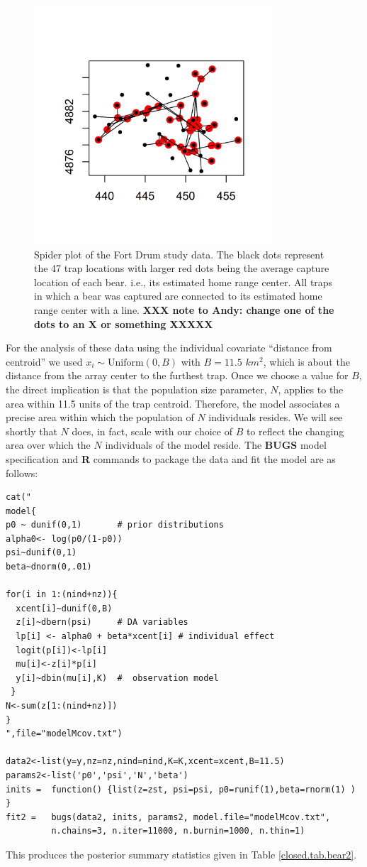 \begin{figure}[ht]
\centering
\includegraphics[height=3.5in,width=3.5in]{Ch4-Closed/figs/bear_spiderplot.png}
\caption{Spider plot of the Fort Drum study data.
The black dots represent the 47 trap locations with larger red dots
being the average capture location of each bear. i.e., its estimated home
range center. All traps in which a bear was captured are connected to
its estimated home range center with a line.
{\bf XXX note to Andy: change one of the dots to an X or something
  XXXXX }
}
\label{closed.fig.spiderplot}
\end{figure}

For the analysis of these data using the individual covariate
``distance from centroid'' we used $x_{i} \sim \mbox{Uniform}(0,B)$
with $B = 11.5$ $km^2$, which is about the distance from the array
center to the furthest trap.  Once we choose a value for $B$, the direct
implication is that the population size parameter, $N$, applies to the area
within 11.5 units of the trap centroid. Therefore, the model
associates a precise area within which the population of $N$ individuals
resides. 
We will see shortly that $N$
does, in fact, scale with our choice of $B$ to reflect the changing
area over which the $N$ individuals of the model reside.  The {\bf
  BUGS} model specification and {\bf R} commands to package the data
and fit the model are as follows:
{\small
\begin{verbatim}
cat("
model{
p0 ~ dunif(0,1)       # prior distributions
alpha0<- log(p0/(1-p0))
psi~dunif(0,1)
beta~dnorm(0,.01)

for(i in 1:(nind+nz)){
  xcent[i]~dunif(0,B)
  z[i]~dbern(psi)     # DA variables
  lp[i] <- alpha0 + beta*xcent[i] # individual effect
  logit(p[i])<-lp[i]
  mu[i]<-z[i]*p[i]
  y[i]~dbin(mu[i],K)  #  observation model
 }
N<-sum(z[1:(nind+nz)])
}
",file="modelMcov.txt")

data2<-list(y=y,nz=nz,nind=nind,K=K,xcent=xcent,B=11.5)
params2<-list('p0','psi','N','beta')
inits =  function() {list(z=zst, psi=psi, p0=runif(1),beta=rnorm(1) ) }
fit2 =   bugs(data2, inits, params2, model.file="modelMcov.txt",
         n.chains=3, n.iter=11000, n.burnin=1000, n.thin=1)
\end{verbatim}
}
This produces the posterior summary statistics given in Table \ref{closed.tab.bear2}.

